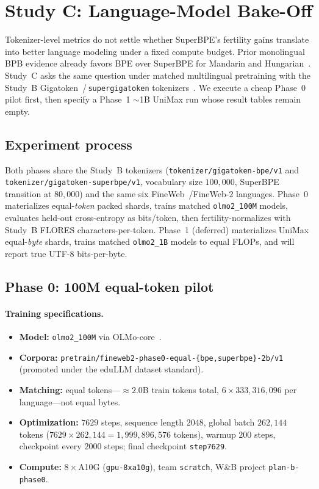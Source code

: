 \documentclass[11pt,a4paper]{article}
\begin{document}
\section{Study C: Language-Model Bake-Off}
\label{sec:study-c}
\label{sec:deferred}

Tokenizer-level metrics do not settle whether SuperBPE's fertility gains translate into better language modeling under a fixed compute budget.
Prior monolingual BPB evidence already favors BPE over SuperBPE for Mandarin and Hungarian~\citep{chowdhury-woolf-2026-benchmarking}.
Study~C asks the same question under matched multilingual pretraining with the Study~B Gigatoken~/\,\texttt{supergigatoken} tokenizers~\citep{roed2026gigatoken,verma2026supergigatoken}.
We execute a cheap Phase~0 pilot first, then specify a Phase~1 $\sim$1B UniMax run whose result tables remain empty.

\subsection{Experiment process}

Both phases share the Study~B tokenizers (\texttt{tokenizer/gigatoken-bpe/v1} and \texttt{tokenizer/gigatoken-superbpe/v1}, vocabulary size $100{,}000$, SuperBPE transition at $80{,}000$) and the same six FineWeb~/FineWeb-2 languages.
Phase~0 materializes equal-\emph{token} packed shards, trains matched \texttt{olmo2\_100M} models, evaluates held-out cross-entropy as bits/token, then fertility-normalizes with Study~B FLORES characters-per-token.
Phase~1 (deferred) materializes UniMax equal-\emph{byte} shards, trains matched \texttt{olmo2\_1B} models to equal FLOPs, and will report true UTF-8 bits-per-byte.

\subsection{Phase 0: 100M equal-token pilot}
\label{sec:phase0}

\paragraph{Training specifications.}
\begin{itemize}[leftmargin=*,itemsep=2pt]
  \item \textbf{Model:} \texttt{olmo2\_100M} via OLMo-core~\citep{olmo2025}.
  \item \textbf{Corpora:} \texttt{pretrain/fineweb2-phase0-equal-\{bpe,superbpe\}-2b/v1} (promoted under the eduLLM dataset standard).
  \item \textbf{Matching:} equal tokens---$\approx 2.0$B train tokens total, $6\times 333{,}316{,}096$ per language---not equal bytes.
  \item \textbf{Optimization:} $7629$ steps, sequence length $2048$, global batch $262{,}144$ tokens ($7629\times 262{,}144 = 1{,}999{,}896{,}576$ tokens), warmup $200$ steps, checkpoint every $2000$ steps; final checkpoint \texttt{step7629}.
  \item \textbf{Compute:} $8\times$A10G (\texttt{gpu-8xa10g}), team \texttt{scratch}, W\&B project \texttt{plan-b-phase0}.
\end{itemize}
\end{document}
